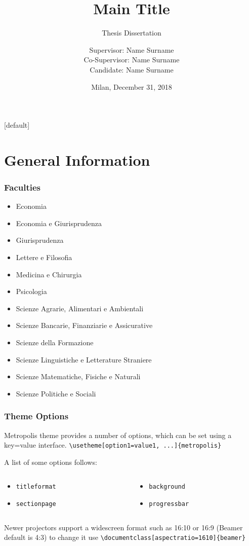 \documentclass[11pt, xcolor=dvipsnames]{beamer}
\title{Main Title} %
\subtitle{Thesis Dissertation}
\author{Supervisor: Name Surname \\ Co-Supervisor: Name Surname \medskip \\
Candidate: Name Surname \\}
\institute{Università Cattolica del Sacro Cuore \\ M.Sc. in \LaTeX \\ Academic Year 2018 $-$ 2019}
\date{Milan, December 31, 2018}
\begin{document}
\maketitle

[default]

\section{General Information}

\begin{frame}
\frametitle{Faculties}
\begin{itemize}
	\item Economia
	\item Economia e Giurisprudenza
	\item Giurisprudenza
	\item Lettere e Filosofia
	\item Medicina e Chirurgia
	\item Psicologia
	\item Scienze Agrarie, Alimentari e Ambientali
	\item Scienze Bancarie, Finanziarie e Assicurative
	\item Scienze della Formazione
	\item Scienze Linguistiche e Letterature Straniere
	\item Scienze Matematiche, Fisiche e Naturali
	\item Scienze Politiche e Sociali
\end{itemize}
\end{frame}

\begin{frame}
\frametitle{Theme Options}
Metropolis theme provides a number of options, which can be set using a key=value interface. \newline
\texttt{\textbackslash \alert{usetheme}[option1=value1, ...]\{metropolis\}} \medskip

A list of some options follows:
 \begin{columns}
	\begin{column}{0.5\textwidth}
   	\begin{itemize}
   		\item \texttt{titleformat}
   		\item \texttt{sectionpage}	
   	\end{itemize}
   	\end{column}
   	\begin{column}{0.5\textwidth}
   	\begin{itemize}
   		\item \texttt{background}
   		\item \texttt{progressbar} \bigskip
   	\end{itemize}
   	\end{column}
\end{columns}
Newer projectors support a widescreen format such as 16:10 or 16:9 (Beamer default is 4:3) to change it use
\texttt{\textbackslash documentclass[aspectratio=1610]\{beamer\}}
\end{frame}
\end{document}
